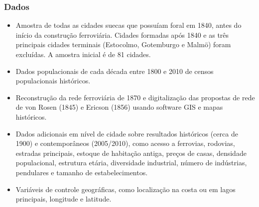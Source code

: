 \documentclass[12pt]{article}
\begin{document}
\subsubsection*{Dados}
\begin{itemize}
    \item Amostra de todas as cidades suecas que possuíam foral em 1840, antes do início da construção ferroviária. Cidades formadas após 1840 e as três principais cidades terminais (Estocolmo, Gotemburgo e Malmö) foram excluídas. A amostra inicial é de 81 cidades.
    \item Dados populacionais de cada década entre 1800 e 2010 de censos populacionais históricos.
    \item Reconstrução da rede ferroviária de 1870 e digitalização das propostas de rede de von Rosen (1845) e Ericson (1856) usando software GIS e mapas históricos.
    \item Dados adicionais em nível de cidade sobre resultados históricos (cerca de 1900) e contemporâneos (2005/2010), como acesso a ferrovias, rodovias, estradas principais, estoque de habitação antiga, preços de casas, densidade populacional, estrutura etária, diversidade industrial, número de indústrias, pendulares e tamanho de estabelecimentos.
    \item Variáveis de controle geográficas, como localização na costa ou em lagos principais, longitude e latitude.
\end{itemize}
\end{document}
